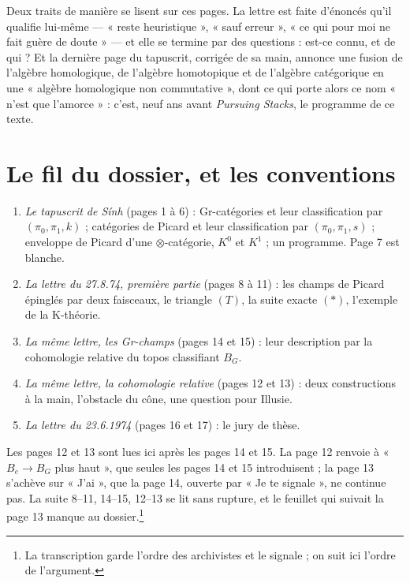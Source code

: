 \documentclass[11pt,a4paper]{article}
\begin{document}
\begin{resume}
Deux traits de manière se lisent sur ces pages. La lettre est faite
d'énoncés qu'il qualifie lui-même --- « reste heuristique », « sauf erreur »,
« ce qui pour moi ne fait guère de doute » --- et elle se termine par des
questions : est-ce connu, et de qui ? Et la dernière page du tapuscrit, corrigée de
sa main, annonce une fusion de l'algèbre homologique, de l'algèbre homotopique et de
l'algèbre catégorique en une « algèbre homologique non commutative », dont
ce qui porte alors ce nom « n'est que l'amorce » : c'est, neuf ans avant
\emph{Pursuing Stacks}, le programme de ce texte.

\end{resume}

\section*{Le fil du dossier, et les conventions}

\begin{enumerate}
\item[1.] \emph{Le tapuscrit de Sính} (pages 1 à 6) : Gr-catégories et leur
classification par $(\pi_0, \pi_1, k)$ ; catégories de Picard et leur
classification par $(\pi_0, \pi_1, s)$ ; enveloppe de Picard d'une
$\otimes$-catégorie, $K^0$ et $K^1$ ; un programme. Page 7 est blanche.
\item[2.] \emph{La lettre du 27.8.74, première partie} (pages 8 à 11) : les
champs de Picard épinglés par deux faisceaux, le triangle $(T)$, la suite
exacte $(*)$, l'exemple de la K-théorie.
\item[3.] \emph{La même lettre, les Gr-champs} (pages 14 et 15) : leur
description par la cohomologie relative du topos classifiant $B_G$.
\item[4.] \emph{La même lettre, la cohomologie relative} (pages 12 et 13) :
deux constructions à la main, l'obstacle du cône, une question pour Illusie.
\item[5.] \emph{La lettre du 23.6.1974} (pages 16 et 17) : le jury de thèse.
\end{enumerate}

Les pages 12 et 13 sont lues ici après les pages 14 et 15. La page 12 renvoie
à « $B_e \to B_G$ plus haut », que seules les pages 14 et 15 introduisent ; la
page 13 s'achève sur « J'ai », que la page 14, ouverte par « Je te signale »,
ne continue pas. La suite 8--11, 14--15, 12--13 se lit sans rupture, et le
feuillet qui suivait la page 13 manque au dossier.\footnote{La transcription
garde l'ordre des archivistes et le signale ; on suit ici l'ordre de
l'argument.}
\end{document}
